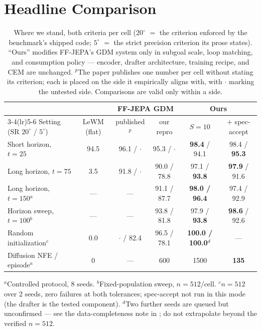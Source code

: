 \documentclass[11pt]{article}
\newcommand{\ours}[1]{\textbf{#1}}          %
\newcommand{\degc}[1]{$#1^\circ$}
\begin{document}
\section{Headline Comparison}
\label{sec:headline}

\begin{table}[h]
\centering
\small
\setlength{\tabcolsep}{5pt}
\caption{Where we stand, both criteria per cell (\degc{20} $=$ the criterion enforced by
the benchmark's shipped code; \degc{5} $=$ the strict precision criterion its prose
states). ``Ours'' modifies FF-JEPA's GDM system only in subgoal scale, loop matching, and
consumption policy --- encoder, drafter architecture, training recipe, and CEM are
unchanged. $^{p}$The paper publishes one number per cell without stating its criterion;
each is placed on the side it empirically aligns with, with $\cdot$ marking the untested
side. Comparisons are valid only within a side.}
\label{tab:headline}
\begin{tabular}{lccccc}
\toprule
& & \multicolumn{2}{c}{FF-JEPA GDM} & \multicolumn{2}{c}{\ours{Ours}} \\
\cmidrule(lr){3-4}\cmidrule(lr){5-6}
Setting (SR \degc{20} / \degc{5}) & LeWM (flat) & published$^{p}$ & our repro & $S{=}10$ & $+$ spec-accept \\
\midrule
Short horizon, $t{=}25$          & 94.5 & 96.1 / $\cdot$ & 95.3 / $\cdot$ & \ours{98.4} / 94.1 & 98.4 / \ours{95.3} \\
Long horizon, $t{=}75$           & 3.5  & 91.8 / $\cdot$ & 90.0 / 78.8 & 97.1 / \ours{93.8} & \ours{97.9} / 91.6 \\
Long horizon, $t{=}150$$^{a}$    & ---  & --- & 91.1 / 87.7 & \ours{98.0 / 96.4} & 97.4 / 92.9 \\
Horizon sweep, $t{=}100$$^{b}$   & ---  & --- & 93.8 / 81.8 & 97.9 / \ours{93.8} & \ours{98.6} / 92.6 \\
Random initialization$^{c}$      & 0.0  & $\cdot$ / 82.4 & 96.5 / 78.1 & \ours{100.0 / 100.0}$^{d}$ & --- \\
\midrule
Diffusion NFE / episode$^{a}$    & 0    & --- & 600 & 1500 & \ours{135} \\
\bottomrule
\end{tabular}

\vspace{1mm}
{\footnotesize $^{a}$Controlled protocol, 8 seeds. $^{b}$Fixed-population sweep,
$n{=}512$/cell. $^{c}$$n{=}512$ over 2 seeds, zero failures at both tolerances;
spec-accept not run in this mode (the drafter is the tested component).
$^{d}$Two further seeds are queued but unconfirmed --- see the data-completeness
note in ; do not extrapolate beyond the verified $n{=}512$.}
\end{table}
\end{document}
